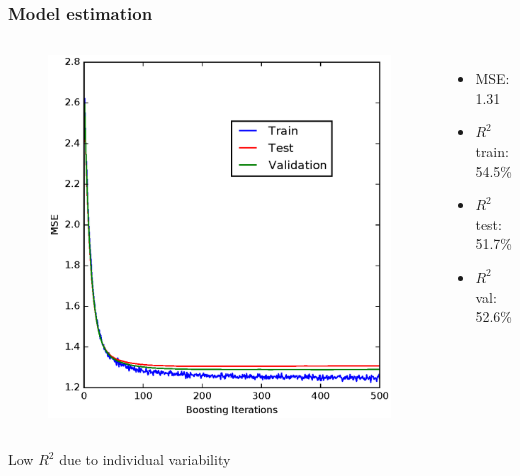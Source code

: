\documentclass{beamer}
\begin{document}

\begin{frame}
\frametitle{Model estimation}
    \vspace{-1cm}
\begin{columns}[c]    
    \centering
\begin{figure}
\includegraphics[scale=0.55]{../fig/devianceCS-present}
\end{figure}
  \centering
  \begin{itemize}
      \item MSE: 1.31
      \item $R^2$ train: 54.5\%
      \item $R^2$ test: 51.7\%
      \item $R^2$ val: 52.6\%
  \end{itemize}
\end{columns}
\centering Low $R^2$ due to individual variability 
\end{frame}


\end{document}
